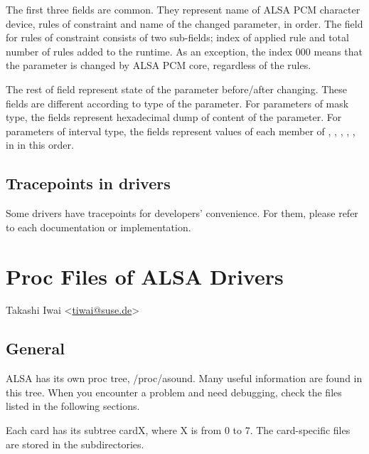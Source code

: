 \documentclass[a4paper,8pt,english]{sphinxmanual}
\begin{document}
The first three fields are common. They represent name of ALSA PCM character
device, rules of constraint and name of the changed parameter, in order. The
field for rules of constraint consists of two sub-fields; index of applied rule
and total number of rules added to the runtime. As an exception, the index 000
means that the parameter is changed by ALSA PCM core, regardless of the rules.

The rest of field represent state of the parameter before/after changing. These
fields are different according to type of the parameter. For parameters of mask
type, the fields represent hexadecimal dump of content of the parameter. For
parameters of interval type, the fields represent values of each member of
, , , , ,  in
 in this order.


\subsection{Tracepoints in drivers}
\label{sound/designs/tracepoints:tracepoints-in-drivers}
Some drivers have tracepoints for developers' convenience. For them, please
refer to each documentation or implementation.


\section{Proc Files of ALSA Drivers}
\label{sound/designs/procfile::doc}\label{sound/designs/procfile:proc-files-of-alsa-drivers}
Takashi Iwai \textless{}\href{mailto:tiwai@suse.de}{tiwai@suse.de}\textgreater{}


\subsection{General}
\label{sound/designs/procfile:general}
ALSA has its own proc tree, /proc/asound.  Many useful information are
found in this tree.  When you encounter a problem and need debugging,
check the files listed in the following sections.

Each card has its subtree cardX, where X is from 0 to 7. The
card-specific files are stored in the  subdirectories.
\end{document}

